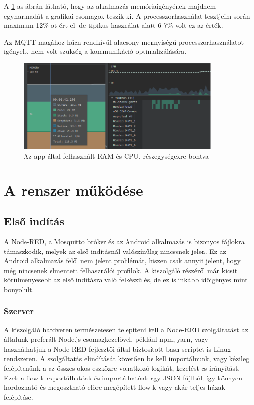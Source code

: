 \documentclass[
]{thesis-ekf}
\theoremstyle{definition}
\theoremstyle{remark}
\begin{document}
A \ref{usage}-as ábrán látható, hogy az alkalmazás memóriaigényének majdnem egyharmadát a grafikai csomagok teszik ki.
A processzorhasználat tesztjeim során maximum 12\%-ot ért el, de tipikus használat alatt 6-7\% volt ez az érték.

Az MQTT magához hűen rendkívül alacsony mennyiségű processzorhasználatot igényelt, nem volt szükség a kommunikáció
optimalizálására.
\begin{figure}
	\centering
	\includegraphics[width=0.9\textwidth]{images/profiler_ram_cpu.png}
	\caption{Az app által felhasznált RAM és CPU, részegységekre bontva}
	\label{usage}
\end{figure}

\chapter{A renszer működése}
\section{Első indítás}
A Node-RED, a Mosquitto bróker és az Android alkalmazás  is bizonyos fájlokra támaszkodik, melyek az első indításnál
valószínűleg nincsenek jelen. Ez az Android alkalmazás felől nem jelent problémát, hiszen csak annyit jelent, hogy még nincsenek
elmentett felhasználói profilok. A kiszolgáló részéről már kicsit körülményesebb az első indításra való felkészülés,
de ez is inkább időigényes mint bonyolult.
\subsection{Szerver}
A kiszolgáló hardveren természetesen telepíteni kell a Node-RED szolgáltatást az általunk preferált Node.js
csomagkezelővel, például npm, yarn, vagy használhatjuk a Node-RED fejlesztői által biztosított bash scriptet is Linux rendszeren.
A szolgáltatás elindítását követően be kell importálnunk, vagy kézileg felépítenünk a az összes okos eszközre vonatkozó
logikát, kezelést és irányítást. Ezek a flow-k exportálhatóak és importálhatóak egy JSON fájlból, így könnyen hordozható
és megosztható előre megépített flow-k vagy akár teljes házak felépítése.
\end{document}
